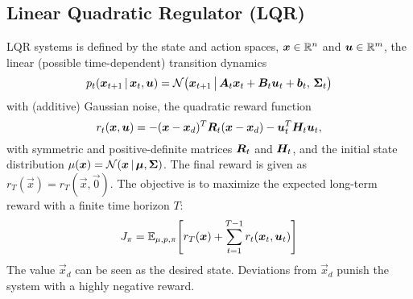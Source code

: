 		\subsection{Linear Quadratic Regulator (LQR)}
			\label{subsec:lqr}


			LQR systems is defined by the state and action spaces, \( \bm{x} \in \mathbb{R}^n \) and \( \bm{u} \in \mathbb{R}^m \), the linear (possible time-dependent) transition dynamics
			\begin{equation*}
				p_t(\bm{x}_{t + 1} \,\vert\, \bm{x}_t, \bm{u}) = \mathcal{N}\big(\bm{x}_{t + 1} \,\big\vert\, \bm{A}_t \bm{x}_t + \bm{B}_t \bm{u}_t + \bm{b}_t,\, \bm{\Sigma}_t \big)
			\end{equation*}
			with (additive) Gaussian noise, the quadratic reward function
			\begin{equation*}
				r_t(\bm{x}, \bm{u}) = -(\bm{x} - \bm{x}_d)^T \bm{R}_t (\bm{x} - \bm{x}_d) - \bm{u}_t^T \bm{H}_t \bm{u}_t,
			\end{equation*}
			with symmetric and positive-definite matrices \(\bm{R}_t\) and \(\bm{H}_t\), and the initial state distribution \( \mu(\bm{x}) = \mathcal{N}(\bm{x} \,\vert\, \bm{\mu}, \bm{\Sigma}) \). The final reward is given as \( r_T(\vec{x}) = r_T(\vec{x}, \vec{0}) \). The objective is to maximize the expected long-term reward with a finite time horizon \(T\):
			\begin{equation*}
				J_\pi = \mathbb{E}_{\mu, p, \pi}\Bigg[ r_T(\bm{x}) + \sum_{t = 1}^{T - 1} r_t(\bm{x}_t, \bm{u}_t) \Bigg]
			\end{equation*}
			The value \(\vec{x}_d\) can be seen as the desired state. Deviations from \(\vec{x}_d\) punish the system with a highly negative reward.

